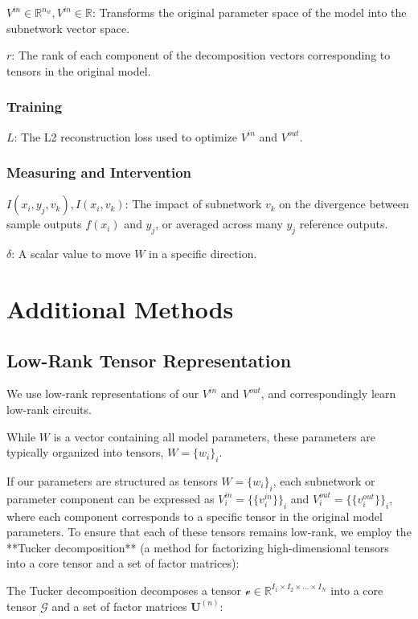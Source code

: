 \documentclass{article}
\theoremstyle{plain}
\theoremstyle{definition}
\theoremstyle{remark}
\begin{document}
$V^{in} \in \mathbb{R}^{n_w}, V^{in} \in \mathbb{R}$: Transforms the original parameter space of the model into the subnetwork vector space. 

$r$: The rank of each component of the decomposition vectors corresponding to tensors in the original model. 

\subsubsection{Training}

$L$: The L2 reconstruction loss used to optimize $V^{in}$ and $V^{out}$.

\subsubsection{Measuring and Intervention}
$I(x_i, y_j, v_k), I(x_i, v_k)$: The impact of subnetwork $v_k$ on the divergence between sample outputs $f(x_i)$ and $y_j$, or averaged across many $y_j$ reference outputs.

$\delta$: A scalar value to move $W$ in a specific direction. 


\section{Additional Methods}

\subsection{Low-Rank Tensor Representation}\label{sec:low_rank}


We use low-rank representations of our $V^{in}$ and $V^{out}$, and correspondingly learn low-rank circuits.

While $W$ is a vector containing all model parameters, these parameters are typically organized into tensors, $W=\{w_i\}_i$.

If our parameters are structured as tensors $W = \{w_i\}_i$, each subnetwork or parameter component can be expressed as $V^{in}_i = \{\{v^{in}_i\}\}_i$ and $V^{out}_i = \{\{v^{out}_i\}\}_i$, where each component corresponds to a specific tensor in the original model parameters. To ensure that each of these tensors remains low-rank, we employ the **Tucker decomposition** \cite{tucker1966some} (a method for factorizing high-dimensional tensors into a core tensor and a set of factor matrices):

The Tucker decomposition decomposes a tensor \( \mathcal{v} \in \mathbb{R}^{I_1 \times I_2 \times \dots \times I_N} \) into a core tensor \( \mathcal{G} \) and a set of factor matrices \( \mathbf{U}^{(n)} \):
\end{document}
